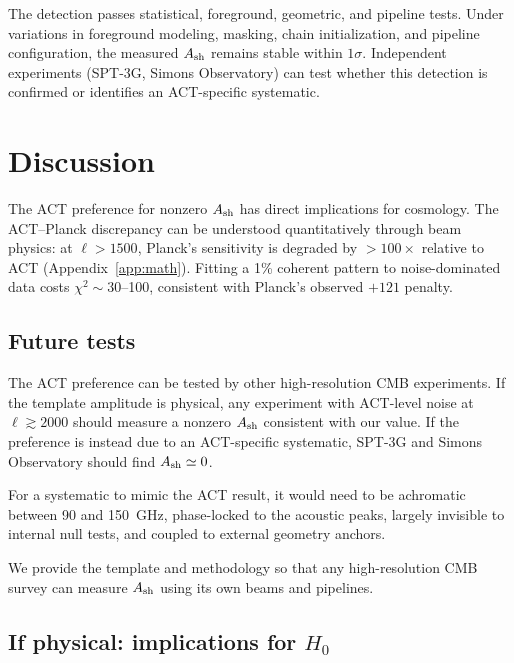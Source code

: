 \documentclass[onecolumn,showpacs,preprintnumbers,amsmath,amssymb,prd]{revtex4-2}
\begin{document}
The detection passes statistical, foreground, geometric, and pipeline 
tests. Under variations in foreground modeling, masking, chain initialization, 
and pipeline configuration, the measured $A_{\rm sh}$ remains stable within 
$1\sigma$. Independent experiments (SPT-3G, Simons Observatory) can test 
whether this detection is confirmed or identifies an ACT-specific systematic.

\section{Discussion}
\label{sec:discussion}

The ACT preference for nonzero $A_{\rm sh}$ has direct implications for 
cosmology. The ACT--Planck discrepancy can be understood quantitatively 
through beam physics: at $\ell > 1500$, Planck's sensitivity is degraded 
by $>100\times$ relative to ACT (Appendix~\ref{app:math}). Fitting a 1\% 
coherent pattern to noise-dominated data costs $\chi^2 \sim 30$--100, 
consistent with Planck's observed $+121$ penalty.

\subsection{Future tests}

The ACT preference can be tested by other high-resolution CMB experiments. 
If the template amplitude is physical, any experiment with ACT-level noise 
at $\ell \gtrsim 2000$ should measure a nonzero $A_{\rm sh}$ consistent 
with our value. If the preference is instead due to an ACT-specific 
systematic, SPT-3G and Simons Observatory should find $A_{\rm sh} \simeq 0$.

For a systematic to mimic the ACT result, it would need to be achromatic 
between 90 and 150~GHz, phase-locked to the acoustic peaks, largely 
invisible to internal null tests, and coupled to external geometry anchors.

We provide the template and methodology so that any high-resolution CMB 
survey can measure $A_{\rm sh}$ using its own beams and pipelines.

\subsection{If physical: implications for $H_0$}
\end{document}
